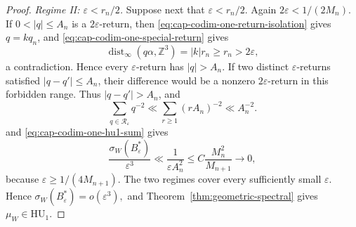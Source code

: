 \documentclass[10pt,a4paper]{amsart}
\newcommand{\HU}{\mathrm{HU}}
\begin{document}
\begin{proof}
\smallskip\noindent\emph{Regime II: $\varepsilon<r_n/2$.}
Suppose next that $\varepsilon<r_n/2$.  Again $2\varepsilon<1/(2M_n)$.  If
$0<|q|\leq A_n$ is a $2\varepsilon$-return, then
\eqref{eq:cap-codim-one-return-isolation} gives $q=kq_n$, and
\eqref{eq:cap-codim-one-special-return} gives
\[
  \operatorname{dist}_\infty(q\alpha,\mathbb Z^3)
  =|k|r_n\geq r_n>2\varepsilon,
\]
a contradiction.  Hence every $\varepsilon$-return has $|q|>A_n$.
If two distinct $\varepsilon$-returns satisfied $|q-q'|\leq A_n$, their
difference would be a nonzero $2\varepsilon$-return in this forbidden range.
Thus $|q-q'|>A_n$, and
\[
  \sum_{q\in\mathcal R_\varepsilon}q^{-2}
  \ll\sum_{r\geq1}(rA_n)^{-2}
  \ll A_n^{-2}.
\]
and \eqref{eq:cap-codim-one-hu1-sum} gives
\begin{equation}\label{eq:cap-codim-one-second-regime}
  \frac{\sigma_W(B_\varepsilon^*)}{\varepsilon^3}
  \ll\frac1{\varepsilon A_n^2}
  \leq C\frac{M_n^2}{M_{n+1}}
  \longrightarrow0,
\end{equation}
because $\varepsilon\geq1/(4M_{n+1})$.  The two regimes cover every
sufficiently small $\varepsilon$.  Hence
\(
  \sigma_W(B_\varepsilon^*)=o(\varepsilon^3),
\)
and Theorem~\ref{thm:geometric-spectral} gives $\mu_W\in\HU_1$.


\end{proof}
\end{document}
